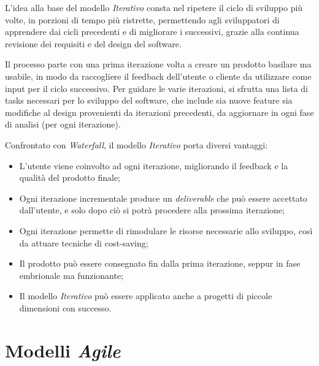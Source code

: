 \documentclass[a4paper,12pt]{report}
\begin{document}
				\vspace{3mm}
				L'idea alla base del modello \emph{Iterativo} consta nel ripetere il ciclo di sviluppo più volte, in porzioni di tempo più ristrette,
				permettendo agli sviluppatori di apprendere dai cicli precedenti e di migliorare i successivi, grazie alla continua
				revisione dei requisiti e del design del software.
				
				\vspace{3mm}
				Il processo parte con una prima iterazione volta a creare un prodotto basilare ma usabile, in modo da raccogliere il feedback
				dell'utente o cliente da utilizzare come input per il ciclo successivo. Per guidare le varie iterazioni, si sfrutta una lista
				di tasks necessari per lo sviluppo del software, che include sia nuove feature sia modifiche al design provenienti da iterazioni
				precedenti, da aggiornare in ogni fase di analisi (per ogni iterazione).
				
				Confrontato con \emph{Waterfall}, il modello \emph{Iterativo} porta diversi vantaggi:
				\begin{itemize}
					\item L'utente viene coinvolto ad ogni iterazione, migliorando il feedback e la qualità del prodotto finale;
					\item Ogni iterazione incrementale produce un \emph{deliverable} che può essere accettato dall'utente, e solo dopo ciò si potrà procedere alla prossima iterazione;
					\item Ogni iterazione permette di rimodulare le risorse necessarie allo sviluppo, così da attuare tecniche di cost-saving;
					\item Il prodotto può essere consegnato fin dalla prima iterazione, seppur in fase embrionale ma funzionante;
					\item Il modello \emph{Iterativo} può essere applicato anche a progetti di piccole dimensioni con successo.
				\end{itemize}
	
		\section{Modelli \emph{Agile}}
	
\end{document}
